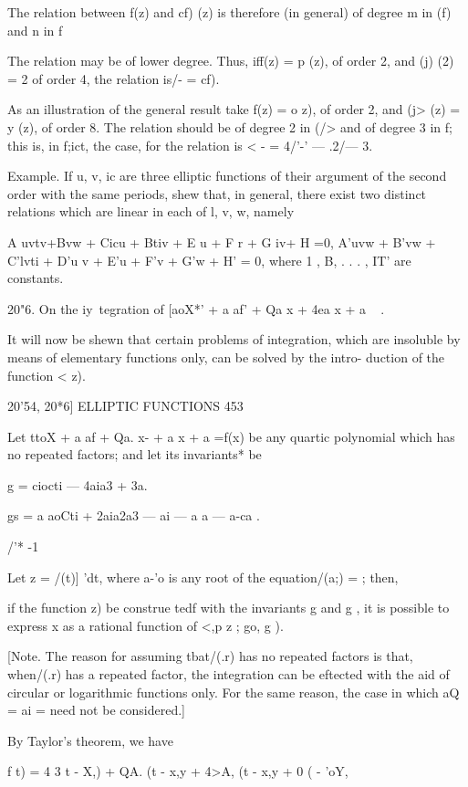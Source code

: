 {The relation between f(z) and cf) (z) is therefore (in general) of
degree m in (f) and n in f

The relation may be of lower degree. Thus, iff(z) = p (z), of order 2,
and (j) (2) = 2 of order 4, the relation is/- = cf).

As an illustration of the general result take f(z) = o z), of order 2,
and (j> (z) = y (z), of order 8. The relation should be of degree 2 in
(/> and of degree 3 in f; this is, in f;ict, the case, for the
relation is < - = 4/'-' — .2/— 3.

Example. If u, v, ic are three elliptic functions of their argument of
the second order with the same periods, shew that, in general, there
exist two distinct relations which are linear in each of l, v, w,
namely

A uvtv+Bvw + Cicu + Btiv + E u + F r + G iv+ H =0, A'uvw + B'vw +
C'lvti + D'u v + E'u + F'v + G'w + H' = 0, where 1 , B, . . . , IT'
are constants.

20"6. On the iy\ tegration of [aoX*' + a af' + Qa x + 4ea x + a ~ .

It will now be shewn that certain problems of integration, which are
insoluble by means of elementary functions only, can be solved by the
intro- duction of the function < z).



20'54, 20*6] ELLIPTIC FUNCTIONS 453

Let ttoX + a af + Qa. x- + a x + a =f(x) be any quartic polynomial
which has no repeated factors; and let its invariants* be

g = ciocti — 4aia3 + 3a.

gs = a aoCti + 2aia2a3 — ai — a a — a-ca .

/'* -1

Let z = /(t)] 'dt, where a-'o is any root of the equation/(a;) = ;
then,

if the function z) be construe tedf with the invariants g and g , it
is possible to express x as a rational function of <,p z ; go, g ).

[Note. The reason for assuming tbat/(.r) has no repeated factors is
that, when/(.r) has a repeated factor, the integration can be eftected
with the aid of circular or logarithmic functions only. For the same
reason, the case in which aQ = ai = need not be considered.]

By Taylor's theorem, we have

f t) = 4 3 t - X,) + QA. (t - x,y + 4>A, (t - x,y + 0 ( - 'oY,

}
